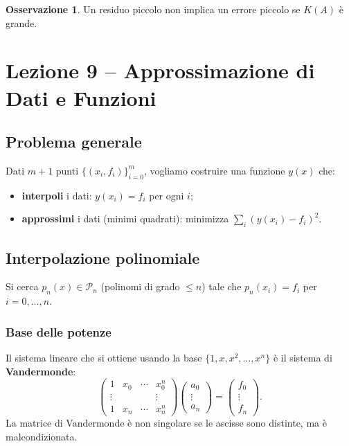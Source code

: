 \documentclass[12pt,a4paper]{article}
\theoremstyle{definition}
\newtheorem{osservazione}{Osservazione}[section]
\begin{document}
\begin{osservazione}
Un residuo piccolo non implica un errore piccolo se $K(A)$ è grande.
\end{osservazione}

\section{Lezione 9 -- Approssimazione di Dati e Funzioni}

\subsection{Problema generale}

Dati $m+1$ punti $\{(x_i, f_i)\}_{i=0}^{m}$, vogliamo costruire una funzione $y(x)$ che:
\begin{itemize}
  \item \textbf{interpoli} i dati: $y(x_i) = f_i$ per ogni $i$;
  \item \textbf{approssimi} i dati (minimi quadrati): minimizza $\sum_i (y(x_i) - f_i)^2$.
\end{itemize}

\subsection{Interpolazione polinomiale}

Si cerca $p_n(x) \in \mathcal{P}_n$ (polinomi di grado $\leq n$) tale che $p_n(x_i) = f_i$ per $i=0,\ldots,n$.

\subsubsection{Base delle potenze}
Il sistema lineare che si ottiene usando la base $\{1, x, x^2, \ldots, x^n\}$ è il sistema di \textbf{Vandermonde}:
\[
  \begin{pmatrix} 1 & x_0 & \cdots & x_0^n \\ \vdots & & & \vdots \\ 1 & x_n & \cdots & x_n^n \end{pmatrix}
  \begin{pmatrix} a_0 \\ \vdots \\ a_n \end{pmatrix}
  =
  \begin{pmatrix} f_0 \\ \vdots \\ f_n \end{pmatrix}.
\]
La matrice di Vandermonde è non singolare se le ascisse sono distinte, ma è malcondizionata.
\end{document}
